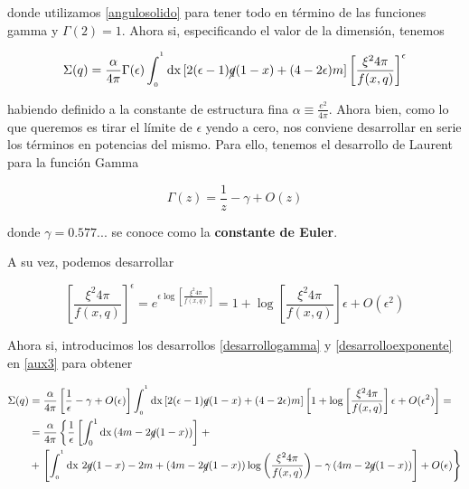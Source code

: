 \documentclass{article}
\numberwithin{equation}{section}
\begin{document}
donde utilizamos \ref{angulosolido} para tener todo en término de las funciones gamma y $ \Gamma(2)=1 $. Ahora si, especificando el valor de la dimensión, tenemos

\begin{equation}\label{aux3}
\Sigma(q)= \frac{\alpha}{4\pi}\Gamma(\epsilon)\int_{_{0}}^{^{1}}\mathrm{dx} \left[2(\epsilon-1)\cancel{q}(1-x)+(4-2\epsilon)m \right] \left[\frac{\xi^2 4\pi}{f(x,q)}\right]^{\epsilon}
\end{equation}

habiendo definido a la constante de estructura fina $ \alpha\equiv \frac{e^2}{4\pi} $. Ahora bien, como lo que queremos es tirar el límite de $ \epsilon $ yendo a cero, nos conviene desarrollar en serie los términos en potencias del mismo. Para ello, tenemos el desarrollo de Laurent para la función Gamma

\begin{equation}\label{desarrollogamma}
\Gamma(z)=\frac{1}{z} - \gamma + O(z)
\end{equation}

donde $ \gamma = 0.577... $ se conoce como la \textbf{constante de Euler}.

A su vez, podemos desarrollar

\begin{equation}\label{desarrolloexponente}
\left[\frac{\xi^2 4\pi}{f(x,q)}\right]^{\epsilon} = e^{\epsilon \log\left[\frac{\xi^2 4\pi}{f(x,q)}\right]} = 1 + \log\left[\frac{\xi^2 4\pi}{f(x,q)}\right] \epsilon + O(\epsilon^2)
\end{equation}

Ahora si, introducimos los desarrollos \ref{desarrollogamma} y \ref{desarrolloexponente} en \ref{aux3} para obtener

\begin{equation}\label{aux4}
\begin{aligned}
\Sigma(q)&=\frac{\alpha}{4\pi}\left[\frac{1}{\epsilon} - \gamma + O(\epsilon) \right] \int_{_{0}}^{^{1}}\mathrm{dx} \left[2(\epsilon-1)\cancel{q}(1-x)+(4-2\epsilon)m \right] \left[1 + \log\left[\frac{\xi^2 4\pi}{f(x,q)}\right] \epsilon + O(\epsilon^2)\right]=\\
&=\frac{\alpha}{4\pi} \left\{\frac{1}{\epsilon} \left[\int_0^1 \mathrm{dx} \left( 4m - 2\cancel{q}(1-x)\right)\right] \right. + \\
&+ \left. \left[ \int_{_{0}}^{^{1}}\mathrm{dx} \  2\cancel{q}(1-x)-2m + \left( 4m - 2\cancel{q}(1-x)\right) \log \left(\frac{\xi^2 4\pi}{f(x,q)}\right) - \gamma \left( 4m - 2\cancel{q}(1-x)\right)\right]  + O(\epsilon)\right\} 
\end{aligned}
\end{equation}
 
\end{document}
